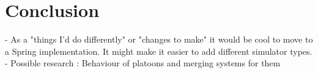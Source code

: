 \chapter{Conclusion}
\label{cha:Conclusion}
- As a "things I'd do differently" or "changes to make" it would be cool to move to a Spring implementation. It might make it easier to add different simulator types.
- Possible research : Behaviour of platoons and merging systems for them
